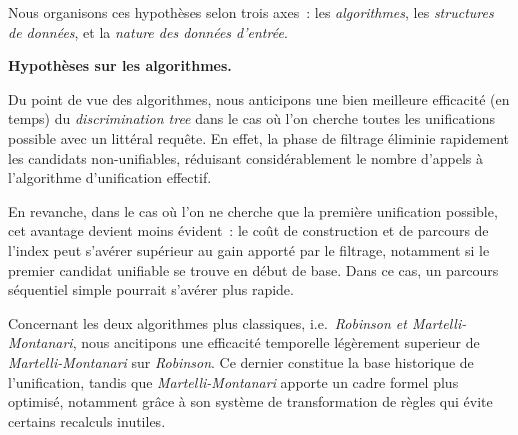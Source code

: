 \documentclass[11pt]{article}
\newenvironment{paraph}[1]{%
  \medskip
  \noindent\textbf{#1.}\quad

  \vspace{0.2cm}
}{%
  \medskip
}
\begin{document}
\vspace{0.2cm}
Nous organisons ces hypothèses selon trois axes~: les 
\textit{algorithmes}, les \textit{structures de données}, 
et la \textit{nature des données d'entrée}.

\begin{paraph}{Hypothèses sur les algorithmes}
    Du point de vue des algorithmes, nous anticipons une bien meilleure efficacité (en temps)
    du \textit{discrimination tree} dans le cas où l'on cherche toutes les unifications
    possible avec un littéral requête. En effet, la phase de filtrage éliminie rapidement 
    les candidats non-unifiables, réduisant considérablement le nombre d'appels à l'algorithme d'unification effectif.

    \vspace{0.2cm}
    En revanche, dans le cas où l'on ne cherche que la première unification possible, cet
    avantage devient moins évident~: le coût de construction et de parcours de l'index peut
    s'avérer supérieur au gain apporté par le filtrage, notamment si le premier candidat
    unifiable se trouve en début de base. Dans ce cas, un parcours séquentiel simple pourrait s'avérer plus rapide.

    \vspace{0.2cm}
    Concernant les deux algorithmes plus classiques, i.e.~\textit{Robinson et Martelli-Montanari},
    nous ancitipons une efficacité temporelle légèrement superieur de \textit{Martelli-Montanari} sur \textit{Robinson}. Ce
    dernier constitue la base historique de l'unification, tandis que \textit{Martelli-Montanari}
    apporte un cadre formel plus optimisé, notamment grâce à son système de transformation de
    règles qui évite certains recalculs inutiles.
\end{paraph}
\end{document}
